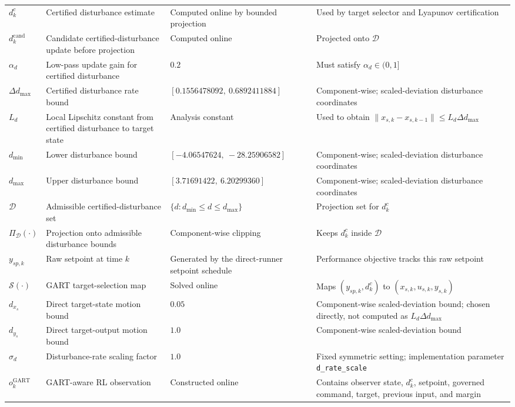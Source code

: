 \documentclass[11pt]{article}
\begin{document}
\begin{longtable}{>{\raggedright\arraybackslash}p{}>{\raggedright\arraybackslash}p{}>{\raggedright\arraybackslash}p{}>{\raggedright\arraybackslash}p{}}
$d^c_k$ & Certified disturbance estimate & Computed online by bounded projection & Used by target selector and Lyapunov certification \\
$d^{\mathrm{cand}}_k$ & Candidate certified-disturbance update before projection & Computed online & Projected onto $\mathcal D$ \\
$\alpha_d$ & Low-pass update gain for certified disturbance & $0.2$ & Must satisfy $\alpha_d\in(0,1]$ \\
$\Delta d_{\max}$ & Certified disturbance rate bound & $[0.1556478092,\ 0.6892411884]$ & Component-wise; scaled-deviation disturbance coordinates \\
$L_d$ & Local Lipschitz constant from certified disturbance to target state & Analysis constant & Used to obtain $\|x_{s,k}-x_{s,k-1}\|\le L_d\Delta d_{\max}$ \\
$d_{\min}$ & Lower disturbance bound & $[-4.06547624,\ -28.25906582]$ & Component-wise; scaled-deviation disturbance coordinates \\
$d_{\max}$ & Upper disturbance bound & $[3.71691422,\ 6.20299360]$ & Component-wise; scaled-deviation disturbance coordinates \\
$\mathcal D$ & Admissible certified-disturbance set & $\{d:d_{\min}\le d\le d_{\max}\}$ & Projection set for $d^c_k$ \\
$\Pi_{\mathcal D}(\cdot)$ & Projection onto admissible disturbance bounds & Component-wise clipping & Keeps $d^c_k$ inside $\mathcal D$ \\
$y_{sp,k}$ & Raw setpoint at time $k$ & Generated by the direct-runner setpoint schedule & Performance objective tracks this raw setpoint \\
$\mathcal S(\cdot)$ & GART target-selection map & Solved online & Maps $(y_{sp,k},d^c_k)$ to $(x_{s,k},u_{s,k},y_{s,k})$ \\
$d_{x_s}$ & Direct target-state motion bound & $0.05$ & Component-wise scaled-deviation bound; chosen directly, not computed as $L_d\Delta d_{\max}$ \\
$d_{y_s}$ & Direct target-output motion bound & $1.0$ & Component-wise scaled-deviation bound \\
$\sigma_d$ & Disturbance-rate scaling factor & $1.0$ & Fixed symmetric setting; implementation parameter \texttt{d\_rate\_scale} \\
$o_k^{\mathrm{GART}}$ & GART-aware RL observation & Constructed online & Contains observer state, $d^c_k$, setpoint, governed command, target, previous input, and margin \\

\end{longtable}
\end{document}
